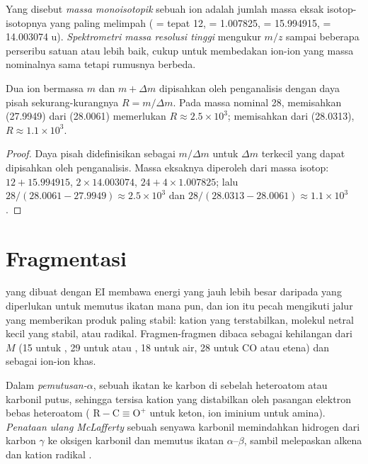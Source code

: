 \begin{definition}\label{def:b2:mass-spec-atomic:exact-mass}
Yang disebut \emph{massa monoisotopik} sebuah ion
adalah jumlah massa eksak isotop-isotopnya yang paling melimpah
( = tepat 12,  = 1.007825,  = 15.994915,
 = 14.003074 u). \emph{Spektrometri massa resolusi
tinggi} mengukur $m/z$ sampai
beberapa perseribu satuan atau lebih baik, cukup untuk membedakan ion-ion
yang massa nominalnya sama tetapi rumusnya berbeda.
\end{definition}

\begin{proposition}\label{prop:b2:mass-spec-atomic:resolving}
Dua ion bermassa $m$ dan $m + \Delta m$ dipisahkan oleh penganalisis dengan
daya pisah sekurang-kurangnya
$R = m/\Delta m$. Pada massa nominal 28, memisahkan  (27.9949) dari  (28.0061) memerlukan $R
\approx 2.5 \times 10^3$; memisahkan  dari  (28.0313), $R \approx 1.1 \times 10^3$.
\end{proposition}

\begin{proof}
Daya pisah didefinisikan sebagai $m/\Delta m$ untuk $\Delta m$ terkecil yang
dapat dipisahkan oleh penganalisis. Massa eksaknya diperoleh dari massa
isotop: $12 + 15.994915$, $2 \times 14.003074$, $24 + 4 \times
1.007825$; lalu $28/(28.0061 - 27.9949) \approx 2.5 \times 10^3$ dan $28/(28.0313 - 28.0061) \approx
1.1 \times 10^3$.
\end{proof}

\section{Fragmentasi}

 yang dibuat dengan EI membawa energi yang jauh lebih besar
daripada yang diperlukan untuk memutus ikatan mana pun, dan ion itu pecah
mengikuti jalur yang memberikan produk paling stabil: kation yang
terstabilkan, molekul netral kecil yang stabil, atau radikal. Fragmen-fragmen
dibaca sebagai kehilangan dari $M$ (15 untuk , 29 untuk  atau , 18
untuk air, 28 untuk CO atau etena) dan sebagai ion-ion khas.

\begin{definition}\label{def:b2:mass-spec-atomic:fragmentation}
Dalam \emph{pemutusan-$\alpha$},
sebuah ikatan ke karbon di sebelah heteroatom atau karbonil putus, sehingga
tersisa kation yang distabilkan oleh pasangan elektron bebas heteroatom
( $\mathrm{R{-}C{\equiv}O^+}$ untuk keton, ion iminium untuk
amina). \emph{Penataan ulang
McLafferty} sebuah senyawa karbonil
memindahkan hidrogen dari karbon
$\gamma$ ke oksigen karbonil dan memutus ikatan $\alpha$--$\beta$, sambil
melepaskan alkena dan kation radikal .
\end{definition}

